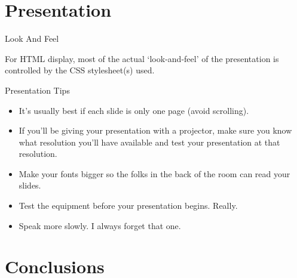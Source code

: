 \documentclass[pdf,frames,slideColor, rcas]{prosper}
\begin{document}
\part{Presentation            }
\label{id2719548}


\begin{slide}{Look And Feel}
\label{id2719559}

For HTML display, most of the actual
`look-and-feel' of the presentation is controlled by the CSS
stylesheet(s) used.
\end{slide}

\begin{slide}{Presentation Tips}
\label{id2719574}
\begin{itemize}

	\item 
It's usually best if each slide is only one page (avoid scrolling).



	\item 
If you'll be giving your presentation with a projector, make sure you
know what resolution you'll have available and test your presentation at that resolution.



	\item 
Make your fonts bigger so the folks in the back of the room can read
your slides.



	\item 
Test the equipment before your presentation begins. Really.



	\item 
Speak more slowly. I always forget that one.


\end{itemize}
\end{slide}
                                                                        

\part{Conclusions            }
\label{id2719622}
\end{document}
